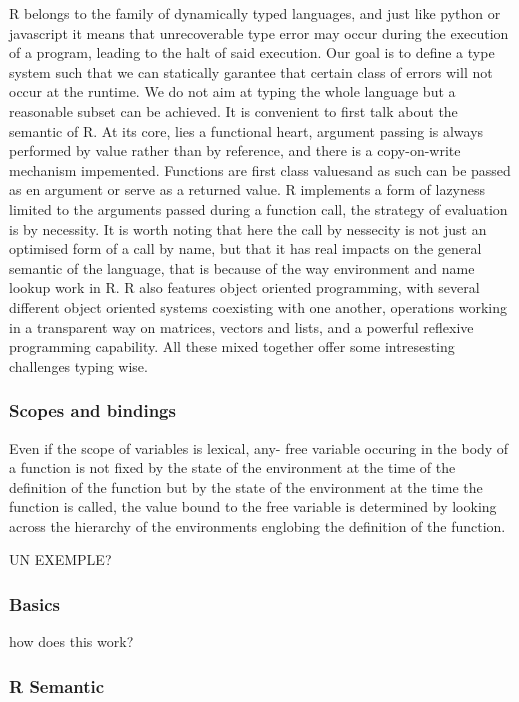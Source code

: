 R belongs to the family of dynamically typed languages, and just like python or javascript it means that unrecoverable type error may occur during the execution of a program, leading to the halt of said execution. Our goal is to define a type system such that we can statically garantee that certain class of errors will not occur at the runtime. We do not aim at typing the whole language but a reasonable subset can be achieved.
It is convenient to first talk about the semantic of R. At its core, lies a functional heart, argument passing is always performed by value rather than by reference, and there is a copy-on-write mechanism impemented. Functions are first class valuesand as such can be passed as en argument or serve as a returned value. R implements a form of lazyness limited to the arguments passed during a function call, the strategy of evaluation is by necessity. It is worth noting that here the call by nessecity is not just an optimised form of a call by name, but that it has real impacts on the general semantic of the language, that is because of the way environment and name lookup work in R. R also features object oriented programming, with several different object oriented systems coexisting with one another, operations working in a transparent way on matrices, vectors and lists, and a powerful reflexive programming capability. All these mixed together offer some intresesting challenges typing wise.


\subsubsection{Scopes and bindings}

Even if the scope of variables is lexical, any- free variable occuring in the body of a function is not fixed by the state of the environment at the time of the definition of the function but by the state of the environment at the time the function is called, the value bound to the free variable is determined by looking across the hierarchy of the environments englobing the definition of the function.



UN EXEMPLE?



\subsubsection{Basics}

how does this work?

\subsubsection{R Semantic}

